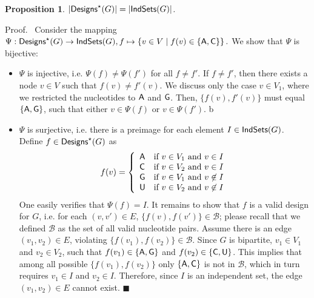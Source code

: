 \documentclass[twocolumn]{bmcart}%
\newtheorem{proposition}[theorem]{Proposition}
\newcommand*{\QEDA}{\hfill\ensuremath{\blacksquare}}%
\newenvironment{proof}[1][]{\noindent Proof\ifthenelse{\equal{#1}{}}{}{ (#1)}.~}{}
\newcommand{\B}{\mathcal{B}}
\newcommand{\Design}[1]{{\sf Designs}^{\star}(#1)}
\newcommand{\IS}[1]{{\sf IndSets}(#1)}
\newcommand{\Nuc}[1]{{\sf #1}}
\newcommand{\Ab}{\Nuc{A}}
\newcommand{\Cb}{\Nuc{C}}
\newcommand{\Gb}{\Nuc{G}}
\newcommand{\Ub}{\Nuc{U}}
\begin{document}
\begin{proposition}\label{prop:bijection}
  $|\Design{G}| = |\IS{G}|$.
\end{proposition}
%
\begin{proof}
Consider the mapping $\Psi: \Design{G} \to \IS{G}, f \mapsto \left\{v\in V\mid f(v)\in\{\Ab,\Cb\}\right\}.$
We show that $\Psi$ is bijective:%
\begin{itemize}
\item $\Psi$ is injective, i.e. $\Psi(f)\neq\Psi(f')$ for all $f\neq f'$.
If $f\neq f'$, then there exists a node $v\in V$ such that $f(v)\neq f'(v)$.
We discuss only the case $v\in V_1$, where we restricted the nucleotides to $\Ab$ and $\Gb$. Then, $\{f(v),f'(v)\}$ must equal $\{\Ab,\Gb\}$, such that either $v\in\Psi(f)$ or $v\in\Psi(f')$.
%
b\item $\Psi$ is surjective, i.e. there is a preimage for each element $I\in \IS{G}$. Define $f\in\Design{G}$ as\begin{displaymath}
f(v) = \left\{\begin{array}{ll} %
\Ab{} & \text{if $v\in V_1$ and $v\in I$} \\ %
\Cb{} & \text{if $v\in V_2$ and $v\in I$} \\
\Gb{} & \text{if $v\in V_1$ and $v\not\in I$} \\ %
\Ub{} & \text{if $v\in V_2$ and $v\not\in I$}
\end{array}\right.
\end{displaymath}
One easily verifies that $\Psi(f) = I$.
%
%
It remains to show that $f$ is a valid design for $G$, i.e. for each $(v, v') \in E$, $\{f(v),f(v')\}\in \B$; please recall that we defined $\B$ as the set of all valid nucleotide pairs.
Assume there is an edge $(v_1,v_2)\in E$, violating $\{f(v_1),f(v_2)\} \in \B$. Since $G$ is bipartite,
$v_1\in V_1$ and $v_2\in V_2$, such that $f(v_1)\in\{\Ab,\Gb\}$ and $f(v_2)\in\{\Cb,\Ub\}$. This implies that among all possible $\{f(v_1), f(v_2)\}$ only $\{\Ab,\Cb\}$ is not in $\B$, which in turn requires $v_1\in I$ and $v_2\in I$. Therefore, since $I$ is an independent set, the edge $(v_1,v_2)\in E$ cannot exist. \QEDA
\end{itemize}
\end{proof}
\end{document}
